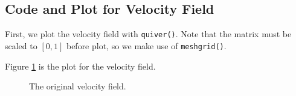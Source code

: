 \documentclass{article}
\begin{document}
  \subsection{Code and Plot for Velocity Field}
  First, we plot the velocity field with \texttt{quiver()}. Note that the matrix must be scaled to $[0, 1]$ before plot, so we make use of \texttt{meshgrid()}.
  
  Figure \ref{fig:vel} is the plot for the velocity field.
  \begin{figure}[H]
    \centering
    \noindent{}
    \caption{The original velocity field.} \label{fig:vel}
  \end{figure}
  
\end{document}
